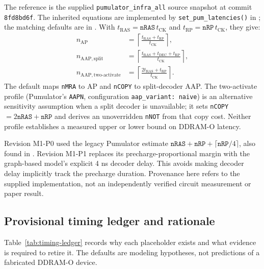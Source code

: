 \documentclass[9pt,twocolumn]{extarticle}
\newcommand{\cmd}[1]{\texttt{#1}}
\newcommand{\param}[1]{\texttt{#1}}
\newcommand{\timingrevision}{M1-P1}
\begin{document}
The reference is the supplied \cmd{pumulator\_infra\_all} source snapshot at
commit \cmd{8fd8bd6f}. The inherited equations are implemented by
\cmd{set\_pum\_latencies()} in
; the matching defaults
are in .
With $t_{\mathrm{RAS}}=\param{nRAS}\,t_{\mathrm{CK}}$ and
$t_{\mathrm{RP}}=\param{nRP}\,t_{\mathrm{CK}}$, they give:
\begin{align*}
 n_{\mathrm{AP}} &= \left\lceil
       \frac{t_{\mathrm{RAS}}+t_{\mathrm{RP}}}{t_{\mathrm{CK}}}
       \right\rceil,\\
 n_{\mathrm{AAP,split}} &= \left\lceil
       \frac{t_{\mathrm{RAS}}+t_{\mathrm{DEC}}+t_{\mathrm{RP}}}
            {t_{\mathrm{CK}}}\right\rceil,\\
 n_{\mathrm{AAP,two\text{-}activate}} &= \left\lceil
       \frac{2t_{\mathrm{RAS}}+t_{\mathrm{RP}}}{t_{\mathrm{CK}}}
       \right\rceil.
\end{align*}
The default maps \param{nMRA} to AP and \param{nCOPY} to split-decoder AAP.
The two-activate profile (Pumulator's \cmd{AAPN}, configuration
\cmd{aap\_variant: naive}) is an alternative sensitivity assumption when a
split decoder is unavailable; it sets
\param{nCOPY}$=2\param{nRAS}+\param{nRP}$ and derives an unoverridden
\param{nNOT} from that copy cost. Neither profile establishes a measured
upper or lower bound on DDRAM-O latency.

Revision M1-P0 used the legacy Pumulator estimate
$\param{nRAS}+\param{nRP}+\lceil\param{nRP}/4\rceil$, also found in
. Revision \timingrevision{} replaces its
precharge-proportional margin with the graph-based model's explicit 4 ns
decoder delay. This avoids making decoder delay implicitly track the
precharge duration. Provenance here refers to the supplied implementation,
not an independently verified circuit measurement or paper result.

\subsection{Provisional timing ledger and rationale}

Table~\ref{tab:timing-ledger} records why each placeholder exists and what
evidence is required to retire it. The defaults are modeling hypotheses, not
predictions of a fabricated DDRAM-O device.
\end{document}
